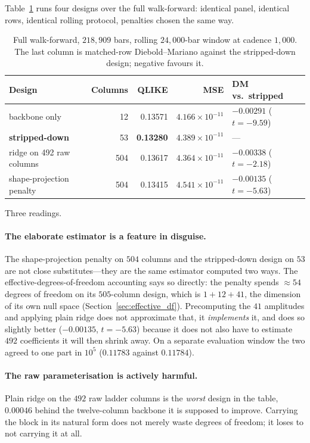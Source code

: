 Table~\ref{tab:dumb} runs four designs over the full walk-forward: identical
panel, identical rows, identical rolling protocol, penalties chosen the same
way.

\begin{table}[H]
\centering
\caption{Full walk-forward, $218{,}909$ bars, rolling $24{,}000$-bar window at
cadence $1{,}000$. The last column is matched-row Diebold--Mariano against the
stripped-down design; negative favours it.}
\label{tab:dumb}
\begin{tabular}{lrrrl}
\toprule
Design & Columns & QLIKE & MSE & DM vs.\ stripped \\
\midrule
backbone only            &  12 & 0.13571 & $4.166 \times 10^{-11}$ & $-0.00291$ ($t = -9.59$) \\
\textbf{stripped-down}   &  53 & \textbf{0.13280} & $4.389 \times 10^{-11}$ & --- \\
ridge on 492 raw columns & 504 & 0.13617 & $4.364 \times 10^{-11}$ & $-0.00338$ ($t = -2.18$) \\
shape-projection penalty & 504 & 0.13415 & $4.541 \times 10^{-11}$ & $-0.00135$ ($t = -5.63$) \\
\bottomrule
\end{tabular}
\end{table}

Three readings.

\paragraph{The elaborate estimator is a feature in disguise.} The
shape-projection penalty on $504$ columns and the stripped-down design on $53$
are not close substitutes---they are the same estimator computed two ways. The
effective-degrees-of-freedom accounting says so directly: the penalty spends
$\approx 54$ degrees of freedom on its $505$-column design, which is
$1 + 12 + 41$, the dimension of its own null space
(Section~\ref{sec:effective_df}). Precomputing the $41$ amplitudes and applying
plain ridge does not approximate that, it \emph{implements} it, and does so
slightly better ($-0.00135$, $t = -5.63$) because it does not also have to
estimate $492$ coefficients it will then shrink away. On a separate evaluation
window the two agreed to one part in $10^{5}$ ($0.11783$ against $0.11784$).

\paragraph{The raw parameterisation is actively harmful.} Plain ridge on the
$492$ raw ladder columns is the \emph{worst} design in the table, $0.00046$
behind the twelve-column backbone it is supposed to improve. Carrying the block
in its natural form does not merely waste degrees of freedom; it loses to not
carrying it at all.


